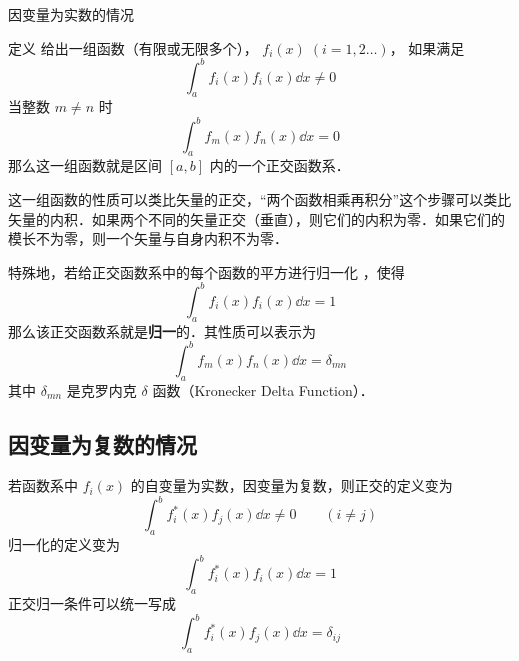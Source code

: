 
因变量为实数的情况

定义
给出一组函数（有限或无限多个）， $f_i(x)\; (i = 1,2\dots)$， 如果满足
\begin{equation}
\int_a^b f_i(x) f_i(x) \dd{x} \ne 0
\end{equation} 
当整数 $m \ne n$ 时
\begin{equation}
\int_a^b f_m(x) f_n(x) \dd{x} = 0
\end{equation} 
那么这一组函数就是区间 $[a,b]$ 内的一个正交函数系．

这一组函数的性质可以类比矢量的正交，“两个函数相乘再积分”这个步骤可以类比矢量的内积．如果两个不同的矢量正交（垂直），则它们的内积为零．如果它们的模长不为零，则一个矢量与自身内积不为零．

特殊地，若给正交函数系中的每个函数的平方进行归一化%
，使得
\begin{equation}
\int_a^b f_i(x) f_i(x) \dd{x} = 1
\end{equation} 
那么该正交函数系就是\textbf{归一}的．其性质可以表示为
 \begin{equation}
\int_a^b f_m(x) f_n(x) \dd{x} = \delta_{mn}
\end{equation} 
其中 $\delta_{mn}$ 是克罗内克 $\delta$ 函数（Kronecker Delta Function）．


\subsection{因变量为复数的情况}

若函数系中 $f_i(x)$ 的自变量为实数，因变量为复数，则正交的定义变为
 \begin{equation}
\int_a^b f_i^*(x) f_j(x) \dd{x} \ne 0 \qquad ( i \ne j )
\end{equation}    
归一化的定义变为
 \begin{equation}
\int_a^b f_i^*(x) f_i(x) \dd{x} = 1
\end{equation} 
正交归一条件可以统一写成
 \begin{equation}
\int_a^b f_i^*(x) f_j(x) \dd{x} = \delta_{ij}
\end{equation}